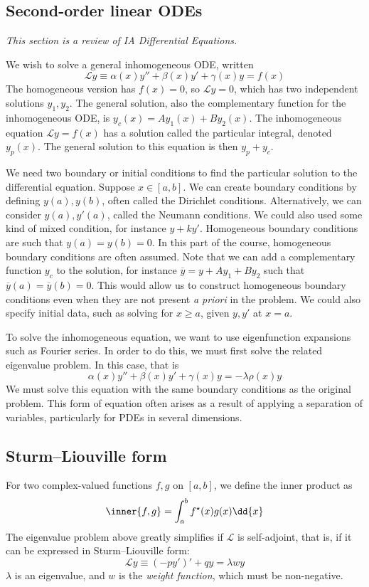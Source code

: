 \subsection{Second-order linear ODEs}
\textit{This section is a review of IA Differential Equations.}

We wish to solve a general inhomogeneous ODE, written
\[
	\mathcal L y \equiv \alpha(x) y'' + \beta(x) y' + \gamma(x) y = f(x)
\]
The homogeneous version has \( f(x) = 0 \), so \( \mathcal L y = 0 \), which has two independent solutions \( y_1, y_2 \).
The general solution, also the complementary function for the inhomogeneous ODE, is \( y_c(x) = A y_1(x) + B y_2(x) \).
The inhomogeneous equation \( \mathcal L y = f(x) \) has a solution called the particular integral, denoted \( y_p(x) \).
The general solution to this equation is then \( y_p + y_c \).

We need two boundary or initial conditions to find the particular solution to the differential equation.
Suppose \( x \in [a,b] \).
We can create boundary conditions by defining \( y(a), y(b) \), often called the Dirichlet conditions.
Alternatively, we can consider \( y(a), y'(a) \), called the Neumann conditions.
We could also used some kind of mixed condition, for instance \( y + ky' \).
Homogeneous boundary conditions are such that \( y(a) = y(b) = 0 \).
In this part of the course, homogeneous boundary conditions are often assumed.
Note that we can add a complementary function \( y_c \) to the solution, for instance \( \overline{y} = y + A y_1 + B y_2 \) such that \( \overline{y}(a) = \overline{y}(b) = 0 \).
This would allow us to construct homogeneous boundary conditions even when they are not present \textit{a priori} in the problem.
We could also specify initial data, such as solving for \( x \geq a \), given \( y, y' \) at \( x = a \).

To solve the inhomogeneous equation, we want to use eigenfunction expansions such as Fourier series.
In order to do this, we must first solve the related eigenvalue problem.
In this case, that is
\[
	\alpha(x) y'' + \beta(x) y' + \gamma(x) y = -\lambda \rho(x) y
\]
We must solve this equation with the same boundary conditions as the original problem.
This form of equation often arises as a result of applying a separation of variables, particularly for PDEs in several dimensions.

\subsection{Sturm--Liouville form}
For two complex-valued functions \( f, g \) on \( [a,b] \), we define the inner product as
\[
	\inner{f,g} = \int_a^b f^\star(x) g(x) \dd{x}
\]
The eigenvalue problem above greatly simplifies if \( \mathcal L \) is self-adjoint, that is, if it can be expressed in Sturm--Liouville form:
\[
	\mathcal L y \equiv (-py')' + qy = \lambda w y
\]
\( \lambda \) is an eigenvalue, and \( w \) is the \textit{weight function}, which must be non-negative.

